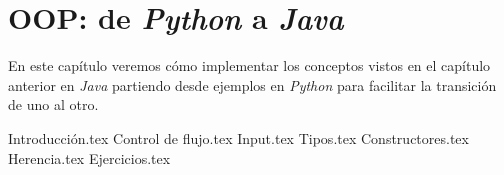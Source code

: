\chapter{OOP: de \textit{Python} a \textit{Java}}
  \label{ch:python-java}
  En este capítulo veremos cómo implementar los conceptos vistos en el capítulo anterior 
  en \textit{Java} partiendo desde ejemplos en \textit{Python} para facilitar la 
  transición de uno al otro.

  {Introducción.tex}
  {Control de flujo.tex}
  {Input.tex}
  {Tipos.tex}
  {Constructores.tex}
  {Herencia.tex}
  {Ejercicios.tex}
%